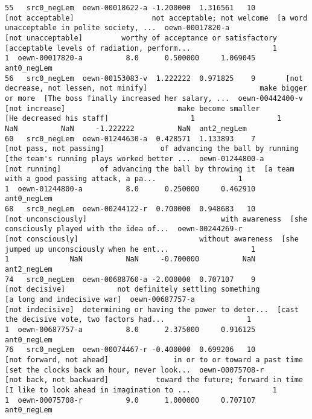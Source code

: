 \documentclass[a4paper,10pt,onecolumn,oneside,openright]{article}
\begin{document}
\begin{verbatim}
55   src0_negLem  oewn-00018622-a -1.200000  1.316561   10                             [not acceptable]                  not acceptable; not welcome  [a word unacceptable in polite society, ...  oewn-00017820-a                           [not unacceptable]         worthy of acceptance or satisfactory  [acceptable levels of radiation, perform...                   1                   1  oewn-00017820-a          8.0      0.500000     1.069045  ant0_negLem
56   src0_negLem  oewn-00153083-v  1.222222  0.971825    9       [not decrease, not lessen, not minify]                          make bigger or more  [The boss finally increased her salary, ...  oewn-00442400-v                               [not increase]                          make become smaller                     [He decreased his staff]                   1                   1              NaN          NaN     -1.222222          NaN  ant2_negLem
60   src0_negLem  oewn-01244630-a  0.428571  1.133893    7                      [not pass, not passing]             of advancing the ball by running  [the team's running plays worked better ...  oewn-01244800-a                                [not running]         of advancing the ball by throwing it  [a team with a good passing attack, a pa...                   1                   1  oewn-01244800-a          8.0      0.250000     0.462910  ant0_negLem
68   src0_negLem  oewn-00244122-r  0.700000  0.948683   10                          [not unconsciously]                               with awareness  [she consciously played with the idea of...  oewn-00244269-r                            [not consciously]                            without awareness  [she jumped up unconsciously when he ent...                   1                   1              NaN          NaN     -0.700000          NaN  ant2_negLem
74   src0_negLem  oewn-00688760-a -2.000000  0.707107    9                               [not decisive]            not definitely settling something                  [a long and indecisive war]  oewn-00687757-a                             [not indecisive]  determining or having the power to deter...  [cast the decisive vote, two factors had...                   1                   1  oewn-00687757-a          8.0      2.375000     0.916125  ant0_negLem
76   src0_negLem  oewn-00074467-r -0.400000  0.699206   10                     [not forward, not ahead]               in or to or toward a past time  [set the clocks back an hour, never look...  oewn-00075708-r                     [not back, not backward]           toward the future; forward in time  [I like to look ahead in imagination to ...                   1                   1  oewn-00075708-r          9.0      1.000000     0.707107  ant0_negLem

\end{verbatim}
\end{document}
